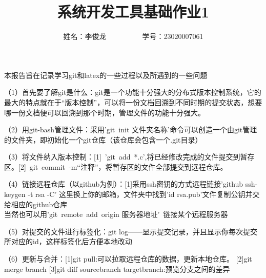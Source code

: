 \documentclass[11pt]{article} %
\title{系统开发工具基础作业1}
\author{姓名：李俊龙\ \ \ \ \ \ \ \ \ \  学号：23020007061 }
\begin{document}
\maketitle

本报告旨在记录学习git和latex的一些过程以及所遇到的一些问题


（1）首先要了解git是什么：git是一个功能十分强大的分布式版本控制系统，它的最大的特点就在于“版本控制”，可以将一份文档回溯到不同时期的提交状态，想要哪一份文档便可以回溯到那个时期，管理文件的功能十分强大。

（2）用git-bash管理文件：采用'git\ init 文件夹名称'命令可以创造一个由git管理的文件夹，即初始化一个git仓库（该仓库会包含一个.git目录）

（3）将文件纳入版本控制：[1]\ 'git\ add\ *.c',将已经修改完成的文件提交到暂存区。[2]\ git\ commit\ -m“注释”，将暂存区的文件全部提交到远程仓库。

（4）链接远程仓库（以github为例）：[1]采用ssh密钥的方式远程链接'github  ssh-keygen -t rsa -C' 这里换上你的邮箱，文件夹中找到'id rsa.pub'文件复制公钥并交给相应的github仓库\\
当然也可以用'git\ remote\ add\ origin 服务器地址'\ 链接某个远程服务器

（5）对提交的文件进行标签化：git log——显示提交记录，并且显示你每次提交所对应的id，这样标签化后方便本地改动

（6）更新与合并：[1]git pull:可以拉取远程仓库的数据，更新本地仓库。
[2]git merge branch
[3]git diff sourcebranch targetbranch:预览分支之间的差异
\end{document}
